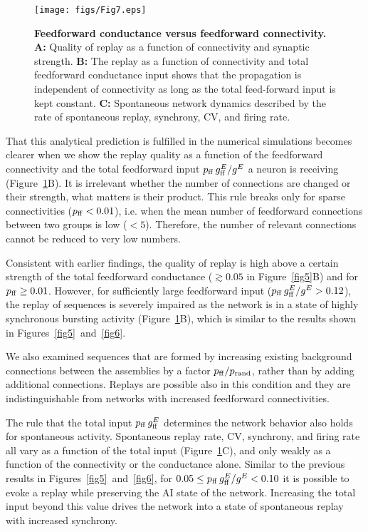     \begin{figure}[!h]
      \center
      \texttt{[image: figs/Fig7.eps]}
      \caption{{\bf Feedforward conductance versus feedforward connectivity.}
        \textbf{A:} Quality of replay as a function of connectivity and synaptic
        strength.
        \textbf{B:} The replay as a function of connectivity and total
        feedforward conductance input shows that the propagation is independent
        of connectivity as long as the total feed-forward input is kept constant.
        \textbf{C:} Spontaneous network dynamics described by the rate of
        spontaneous replay, synchrony, CV, and firing rate.}
      \label{fig7}
    \end{figure}
    
    That this analytical prediction is fulfilled in the numerical simulations
    becomes clearer when we show the replay quality as a function of the
    feedforward connectivity and the total feedforward input $p_{\rm ff}\,
    g^{E}_{\rm ff} / {g^E}$ a neuron is receiving (Figure~\ref{fig7}B). It is
    irrelevant whether the number of connections are changed or their strength,
    what matters is their product. This rule breaks only for sparse
    connectivities ($p_{\rm ff}<0.01$), i.e. when the mean number of
    feedforward connections between two groups is low ($<5$). Therefore, the
    number of relevant connections cannot be reduced to very low numbers.

    Consistent with earlier findings, the quality of replay is high above a
    certain strength of the total feedforward conductance ($\gtrsim 0.05$ in
    Figure~\ref{fig5}B) and for $p_{\rm ff} \ge 0.01$. However, for sufficiently large
    feedforward input ($p_{\rm ff}\, g^{E}_{\rm ff} / {g^E} >0.12$), the replay
    of sequences is severely impaired as the network is in a state of highly
    synchronous bursting activity (Figure~\ref{fig7}B), which is similar to the
    results shown in Figures~\ref{fig5}~and~\ref{fig6}.

    We also examined sequences that are formed by increasing existing
    background connections between the assemblies by a factor $p_{\rm
    ff}/p_{\rm rand}$, rather than by adding additional connections. Replays
    are possible also in this condition and they are indistinguishable from
    networks with increased feedforward connectivities.

    The rule that the total input $p_{\rm ff}\,g^{E}_{\rm ff}$ determines the
    network behavior also holds for spontaneous activity. Spontaneous replay
    rate, CV, synchrony, and firing rate all vary as a function of the total
    input (Figure~\ref{fig7}C), and only weakly as a function of the connectivity
    or the conductance alone. Similar to the previous results in
    Figures~\ref{fig5}~and~\ref{fig6}, for $0.05 \le  p_{\rm ff}\, g^{E}_{\rm ff}
    /  {g^E} < 0.10 $ it is possible to evoke a replay while preserving the AI
    state of the network. Increasing the total input beyond this value drives
    the network into a state of spontaneous replay with increased synchrony.
  

